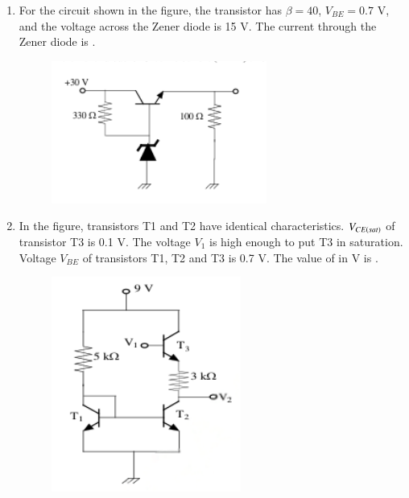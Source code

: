 \documentclass[journal,12pt,onecolumn]{IEEEtran}
\theoremstyle{remark}
\begin{document}
\begin{enumerate}
    \hfill{}
    
    \item For the circuit shown in the figure, the transistor has $\beta = 40$, $V_{BE} = 0.7$ V, and the voltage across the Zener diode is 15 V. The current  through the Zener diode is \underline{\hspace{2cm}}.
    \begin{figure}[H]
        \centering
        \includegraphics[width=0.4\columnwidth]{q38}
        \caption*{}
        \label{fig:q38}
    \end{figure}

    \hfill{}

    \item In the figure, transistors T1 and T2 have identical characteristics. $V_{CE\left(sat\right)}$ of transistor T3 is 0.1 V. The voltage $V_1$ is high enough to put T3 in saturation. Voltage $V_{BE}$ of transistors T1, T2 and T3 is 0.7 V. The value of  in V is \underline{\hspace{2cm}}.
    \begin{figure}[H]
        \centering
        \includegraphics[width=0.4\columnwidth]{q39}
        \caption*{}
        \label{fig:q39}
    \end{figure}

    \hfill{}


\end{enumerate}
\end{document}
